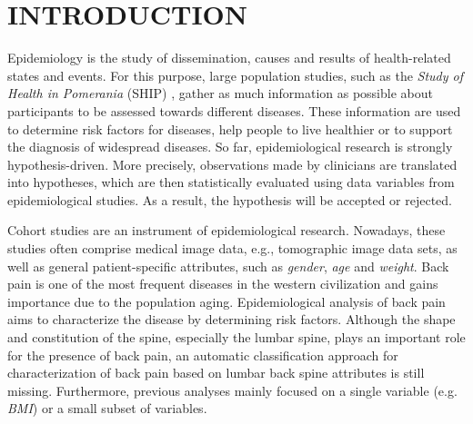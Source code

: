 \documentclass[a4paper,twoside]{style/article}
\begin{document}
\section{\uppercase{Introduction}}
\label{sec:Introduction}
\noindent Epidemiology is the study of dissemination, causes and results of health-related states and events.
For this purpose, large population studies, such as the \emph{Study of Health in Pomerania} (SHIP) \cite{SHIP}, gather as much information as possible about participants to be assessed towards different diseases.
These information are used to determine risk factors for diseases, help people to live healthier or to support the diagnosis of widespread diseases.
So far, epidemiological research is strongly hypothesis-driven.
More precisely, observations made by clinicians are translated into hypotheses, which are then statistically evaluated using data variables from epidemiological studies.
As a result, the hypothesis will be accepted or rejected.

Cohort studies are an instrument of epidemiological research.
Nowadays, these studies often comprise medical image data, e.g., tomographic image data sets, as well as general patient-specific attributes, such as \emph{gender}, \emph{age} and \emph{weight}.
Back pain is one of the most frequent diseases in the western civilization and gains importance due to the population aging.
Epidemiological analysis of back pain aims to characterize the disease by determining risk factors.
Although the shape and constitution of the spine, especially the lumbar spine, plays an important role for the presence of back pain, an automatic classification approach for characterization of back pain based on lumbar back spine attributes is still missing.
Furthermore, previous analyses mainly focused on a single variable (e.g. \emph{BMI}) or a small subset of variables.
\end{document}
